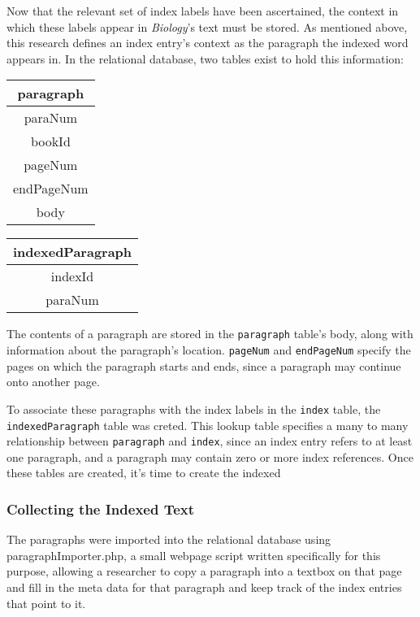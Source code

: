 Now that the relevant set of index labels have been ascertained, the context in which these labels appear in {\it Biology}'s text must be stored.
As mentioned above, this research defines an index entry's context as the paragraph the indexed word appears in.
In the relational database, two tables exist to hold this information:

\begin{center}
\begin{tabular}{|c|}
\hline 
\textbf{paragraph} \\ 
\hline 
paraNum \\ 
\hline 
bookId \\ 
\hline 
pageNum \\ 
\hline 
endPageNum \\ 
\hline 
body \\ 
\hline 
\end{tabular}
\end{center}

\begin{center}
\begin{tabular}{|c|}
\hline 
\textbf{indexedParagraph} \\ 
\hline 
indexId \\ 
\hline 
paraNum \\ 
\hline 
\end{tabular} 
\end{center}

The contents of a paragraph are stored in the {\tt paragraph} table's body, along with information about the paragraph's location.
{\tt pageNum} and {\tt endPageNum} specify the pages on which the paragraph starts and ends, since a paragraph may continue onto another page.

To associate these paragraphs with the index labels in the {\tt index} table, the {\tt indexedParagraph} table was creted.
This lookup table specifies a many to many relationship between {\tt paragraph} and {\tt index}, since an index entry refers to at least one paragraph, and a paragraph may contain zero or more index references. Once these tables are created, it's time to create the indexed

\subsubsection{Collecting the Indexed Text}

The paragraphs were imported into the relational database using paragraphImporter.php, a small webpage script written specifically for this purpose, allowing a researcher to copy a paragraph into a textbox on that page and fill in the meta data for that paragraph and keep track of the index entries that point to it.

